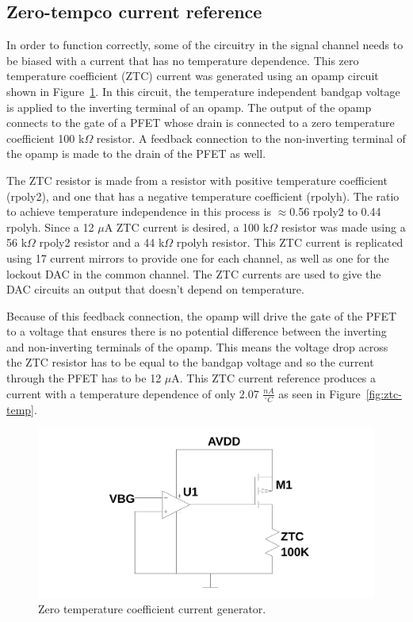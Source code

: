 \documentclass[12pt,oneside,final]{siuethesis}
\theoremstyle{definition}
\begin{document}
\subsection{Zero-tempco current reference}
\par In order to function correctly, some of the circuitry in the signal channel needs to be biased with a current that has no temperature dependence. This zero temperature coefficient (ZTC) current was generated using an opamp circuit shown in Figure~\ref{fig:ztc}. In this circuit, the temperature independent bandgap voltage is applied to the inverting terminal of an opamp. The output of the opamp connects to the gate of a PFET whose drain is connected to a zero temperature coefficient 100 k$\Omega$ resistor. A feedback connection to the non-inverting terminal of the opamp is made to the drain of the PFET as well. 
\par The ZTC resistor is made from a resistor with positive temperature coefficient (rpoly2), and one that has a negative temperature coefficient (rpolyh). The ratio to achieve temperature independence in this process is $\approx$0.56 rpoly2 to 0.44 rpolyh. Since a 12 $\mu$A ZTC current is desired, a 100 k$\Omega$ resistor was made using a 56 k$\Omega$ rpoly2 resistor and a 44 k$\Omega$ rpolyh resistor. This ZTC current is replicated using 17 current mirrors to provide one for each channel, as well as one for the lockout DAC in the common channel. The ZTC currents are used to give the DAC circuits an output that doesn't depend on temperature.
\par Because of this feedback connection, the opamp will drive the gate of the PFET to a voltage that ensures there is no potential difference between the inverting and non-inverting terminals of the opamp. This means the voltage drop across the ZTC resistor has to be equal to the bandgap voltage and so the current through the PFET has to be 12 $\mu$A. This ZTC current reference produces a current with a temperature dependence of only 2.07 $\frac{nA}{^{\circ}C}$ as seen in Figure~\ref{fig:ztc-temp}.
\begin{figure}[htbp!]
\centering
\includegraphics[scale=.3,keepaspectratio=true]{../LTspice_Drawings/ztc_iref/circuit.png} 
\caption{Zero temperature coefficient current generator.}
\label{fig:ztc}
\end{figure}
\end{document}
